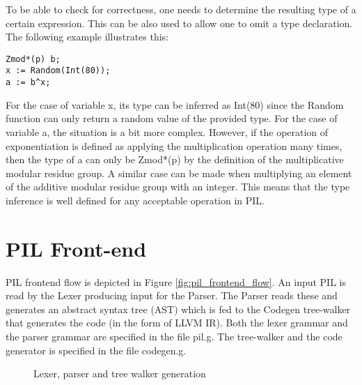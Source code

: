 To be able to check for correctness, one needs to determine the resulting
type of a certain expression. This can be also used to allow one to omit
a type declaration. The following example illustrates this:
\begin{lstlisting}[language=PIL]
Zmod*(p) b;
x := Random(Int(80));
a := b^x;
\end{lstlisting}
For the case of variable x, its type can be inferred as Int(80) since
the Random function can only return a random value of the provided
type. For the case of variable a, the situation is a bit more
complex. However, if the operation of exponentiation is defined as
applying the multiplication operation many times, then the type of a
can only be Zmod*(p) by the definition of the multiplicative modular
residue group. A similar case can be made when multiplying an element
of the additive modular residue group with an integer. This means that
the type inference is well defined for any acceptable operation in
PIL.

\section{PIL Front-end}
\label{sec:pil_frontend}

PIL frontend flow is depicted in Figure \ref{fig:pil_frontend_flow}.  An
input PIL is read by the Lexer producing input for the Parser. The
Parser reads these and generates an abstract syntax tree (AST) which
is fed to the Codegen tree-walker that generates the code (in the form
of LLVM IR). Both the lexer grammar and the parser grammar are
specified in the file pil.g. The tree-walker and the code generator is
specified in the file codegen.g.

\begin{figure}[hb!]
  \centering
   \qquad
  \caption{Lexer, parser and tree walker generation}
\end{figure}

